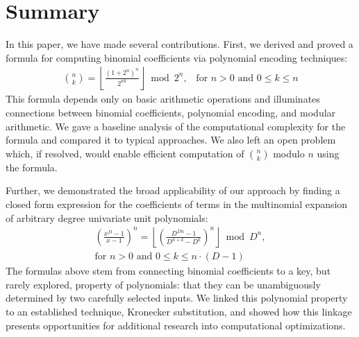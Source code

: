 \documentclass{article}
\theoremstyle{plain}
\theoremstyle{definition}
\begin{document}

\section{Summary}
In this paper, we have made several contributions. First, we derived and proved a formula for computing binomial coefficients via polynomial encoding techniques:
\begin{align*}
    \binom{n}{k} = \left\lfloor\frac{(1 + 2^{n})^{n}}{2^{n k}}\right\rfloor \bmod{2^{n}}\text{,} \quad \text{for } n > 0 \text{ and } 0 \leq k \leq n
\end{align*}
This formula depends only on basic arithmetic operations and illuminates connections between binomial coefficients, polynomial encoding, and modular arithmetic. We gave a baseline analysis of the computational complexity for the formula and compared it to typical approaches. We also left an open problem which, if resolved, would enable efficient computation of \(\binom{n}{k}\) modulo \(n\) using the formula.

Further, we demonstrated the broad applicability of our approach by finding a closed form expression for the coefficients of terms in the multinomial expansion of arbitrary degree univariate unit polynomials:
\begin{align*}
    [x^k] \left(\frac{x^{D}-1}{x-1}\right)^n = \left\lfloor \left(\frac{D^{Dn} - 1}{D^{n+k} - D^k}\right)^n\right\rfloor \bmod D^n, \\ \text{for } n > 0 \text{ and } 0 \leq k \leq n \cdot (D-1)
\end{align*}
The formulas above stem from connecting binomial coefficients to a key, but rarely explored, property of polynomials: that they can be unambiguously determined by two carefully selected inputs. We linked this polynomial property to an established technique, Kronecker substitution, and showed how this linkage presents opportunities for additional research into computational optimizations.



\end{document}
